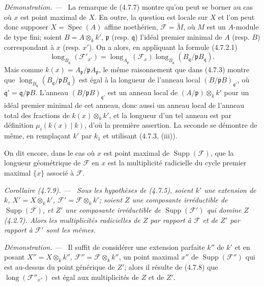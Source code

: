 \documentclass[10pt,oneside]{book}
\newcommand{\oldpage}[2][]{%
  \setcounter{footnote}{0}%
  \marginpar{\scriptsize\textbf{#1}~|~#2}\ignorespaces}
\newenvironment{corollary}[1][]{%
  \par\medskip\noindent\itshape Corollaire (#1). ---\ }{\par}
\newenvironment{proof}{%
  \par\medskip\noindent\textit{Démonstration. ---\ }}{\par}
\begin{document}
\begin{proof}
La remarque de (4.7.7) montre qu'on peut se borner au cas où $x$ est point
maximal de $X$. En outre, la question est locale sur $X$ et l'on peut donc
supposer $X=\operatorname{Spec}(A)$ affine noethérien,
$\mathscr F=\widetilde M$, où $M$ est un $A$-module de type fini; soient
$B=A\otimes_k k'$, $\mathfrak p$ (resp. $\mathfrak q$) l'idéal premier
minimal de $A$ (resp. $B$) correspondant à $x$ (resp. $x'$). On a alors, en
appliquant la formule (4.7.2.1)
\[
\operatorname{long}_{B_{\mathfrak q}}(\mathscr F'_{x'})
=\operatorname{long}_{A_{\mathfrak p}}(\mathscr F_x)
 \operatorname{long}_{B_{\mathfrak q}}
 (B_{\mathfrak q}/\mathfrak pB_{\mathfrak q}).
\]
Mais comme $k(x)=A_{\mathfrak p}/\mathfrak pA_{\mathfrak p}$, le même
raisonnement que dans (4.7.3) montre que
$\operatorname{long}_{B_{\mathfrak q}}
(B_{\mathfrak q}/\mathfrak pB_{\mathfrak q})$ est égal à la longueur de
l'anneau local $(B/\mathfrak pB)_{\mathfrak q'}$, où
$\mathfrak q'=\mathfrak q/\mathfrak pB$. L'anneau
$(B/\mathfrak pB)_{\mathfrak q'}$ est un anneau local de
$(A/\mathfrak p)\otimes_k k'$ pour un idéal premier minimal de cet anneau,
donc aussi un anneau local de l'anneau total des fractions de
$k(x)\otimes_k k'$, et la longueur d'un tel anneau est par définition
$\mu_i(k(x)\mid k)$, d'où la première assertion. La seconde se démontre de
même, en remplaçant $k'$ par $k_1$ et utilisant (4.7.3, (iii)).
\end{proof}

On dit encore, dans le cas où $x$ est point maximal de
$\operatorname{Supp}(\mathscr F)$, que la longueur géométrique de $\mathscr F$
en $x$ est la multiplicité radicielle du cycle premier maximal
$\overline{\{x\}}$ associé à $\mathscr F$.

\begin{corollary}[4.7.9]
\label{IV.2.4.7.9-fr}
Sous les hypothèses de (4.7.5), soient $k'$ une extension de $k$,
$X'=X\otimes_k k'$, $\mathscr F'=\mathscr F\otimes_k k'$; soient $Z$ une
composante irréductible de $\operatorname{Supp}(\mathscr F)$, et $Z'$ une
composante irréductible de $\operatorname{Supp}(\mathscr F')$ qui domine $Z$
(4.2.7). Alors les multiplicités radicielles de $Z$ par rapport à
$\mathscr F$ et de $Z'$ par rapport à $\mathscr F'$ sont les mêmes.
\end{corollary}

\oldpage[IV-2]{79}

\begin{proof}
Il suffit de considérer une extension parfaite $k''$ de $k'$ et en posant
$X''=X\otimes_k k''$, $\mathscr F''=\mathscr F\otimes_k k''$, un point
maximal $x''$ de $\operatorname{Supp}(\mathscr F'')$ qui est au-dessus du
point générique de $Z'$; alors il résulte de (4.7.8) que
$\operatorname{long}(\mathscr F''_{x''})$ est égal aux multiplicités de $Z$ et
de $Z'$.
\end{proof}
\end{document}
